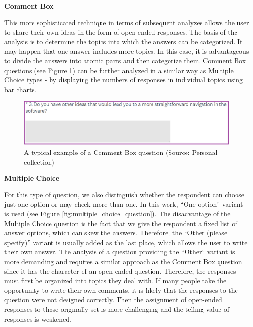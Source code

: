 \documentclass[a4paper,10pt,twoside]{article}
\begin{document}
\smallskip
\vspace*{-0.5cm}
\noindent \textbf {Comment Box}

\noindent This more sophisticated technique in terms of subsequent
analyzes allows the user to share their own ideas in the form of
open-ended responses. The basis of the analysis is to determine the
topics into which the answers can be categorized. It may happen that
one answer includes more topics. In this case, it is advantageous to
divide the answers into atomic parts and then categorize them. Comment
Box questions (see Figure \ref{fig:comment_box_question}) can be
further analyzed in a similar way as Multiple Choice types - by
displaying the numbers of responses in individual topics using bar
charts.

\vspace{0.3cm}
\begin{figure}[hbt!] 
\begin{center}
\includegraphics[width=15cm]{../pictures/comment_box_question.png} 
\caption[A typical example of a Comment Box question]{A typical example of a Comment Box question (Source: Personal collection)}
\label{fig:comment_box_question}
\end{center}
\end{figure}

\newpage
\vspace*{-1cm}
\bigskip
\noindent \textbf {Multiple Choice}

\noindent For this type of question, we also distinguish whether the
respondent can choose just one option or may check more than one. In
this work, ``One option'' variant is used (see Figure
\ref{fig:multiple_choice_question}). The disadvantage of the Multiple
Choice question is the fact that we give the respondent a fixed list
of answer options, which can skew the answers. Therefore, the ``Other
(please specify)'' variant is usually added as the last place, which
allows the user to write their own answer. The analysis of a question
providing the ``Other'' variant is more demanding and requires a
similar approach as the Comment Box question since it has the
character of an open-ended question. Therefore, the responses must
first be organized into topics they deal with. If many people take the
opportunity to write their own comments, it is likely that the
responses to the question were not designed correctly. Then the
assignment of open-ended responses to those originally set is more
challenging and the telling value of responses is weakened.
\end{document}
